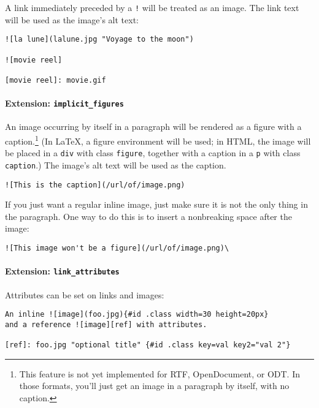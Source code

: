 \documentclass[]{article}
\let\oldparagraph\paragraph
\renewcommand{\paragraph}[1]{\oldparagraph{#1}\mbox{}}
\begin{document}
A link immediately preceded by a \texttt{!} will be treated as an image.
The link text will be used as the image's alt text:

\begin{verbatim}
![la lune](lalune.jpg "Voyage to the moon")

![movie reel]

[movie reel]: movie.gif
\end{verbatim}

\paragraph{\texorpdfstring{Extension:
\texttt{implicit\_figures}}{Extension: implicit\_figures}}\label{extension-implicit_figures}

An image occurring by itself in a paragraph will be rendered as a figure
with a caption.\footnote{This feature is not yet implemented for RTF,
  OpenDocument, or ODT. In those formats, you'll just get an image in a
  paragraph by itself, with no caption.} (In LaTeX, a figure environment
will be used; in HTML, the image will be placed in a \texttt{div} with
class \texttt{figure}, together with a caption in a \texttt{p} with
class \texttt{caption}.) The image's alt text will be used as the
caption.

\begin{verbatim}
![This is the caption](/url/of/image.png)
\end{verbatim}

If you just want a regular inline image, just make sure it is not the
only thing in the paragraph. One way to do this is to insert a
nonbreaking space after the image:

\begin{verbatim}
![This image won't be a figure](/url/of/image.png)\ 
\end{verbatim}

\hypertarget{extension-link_attributes}{\paragraph{\texorpdfstring{Extension:
\texttt{link\_attributes}}{Extension: link\_attributes}}\label{extension-link_attributes}}

Attributes can be set on links and images:

\begin{verbatim}
An inline ![image](foo.jpg){#id .class width=30 height=20px}
and a reference ![image][ref] with attributes.

[ref]: foo.jpg "optional title" {#id .class key=val key2="val 2"}
\end{verbatim}
\end{document}
